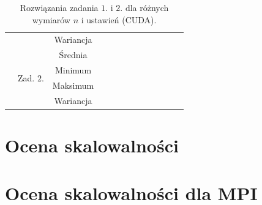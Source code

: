 \documentclass[11pt, a4paper, oneside]{article}
\begin{document}
\begin{table}[t]
\begin{adjustwidth}{-1.76cm}{}
\begin{tabular}{|c|c|c|l|l|l|l|l|l|l|l|l|l|}
                      &                            & Wariancja &                          &                         &                          &                         &                          &                         &                          &                         &                          &                         \\ \cline{2-13} 
                      & \multirow{4}{*}{Zad. $2$.} & Średnia   &                          &                         &                          &                         &                          &                         &                          &                         &                          &                         \\ \cline{3-13} 
                      &                            & Minimum   &                          &                         &                          &                         &                          &                         &                          &                         &                          &                         \\ \cline{3-13} 
                      &                            & Maksimum  &                          &                         &                          &                         &                          &                         &                          &                         &                          &                         \\ \cline{3-13} 
                      &                            & Wariancja &                          &                         &                          &                         &                          &                         &                          &                         &                          &                         \\ \hline
\end{tabular}
\end{adjustwidth}
\caption{Rozwiązania zadania $1$. i $2$. dla różnych wymiarów $n$ i ustawień (CUDA).}
\label{tab:CUDA}
\end{table}

\section{Ocena skalowalności}

\section{Ocena skalowalności dla MPI}
\end{document}
